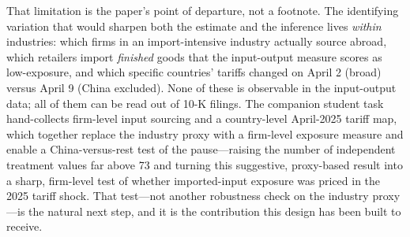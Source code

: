 \documentclass[12pt]{article}
\begin{document}
That limitation is the paper's point of departure, not a footnote. The identifying variation
that would sharpen both the estimate and the inference lives \emph{within} industries: which
firms in an import-intensive industry actually source abroad, which retailers import
\emph{finished} goods that the input-output measure scores as low-exposure, and which specific
countries' tariffs changed on April 2 (broad) versus April 9 (China excluded). None of these
is observable in the input-output data; all of them can be read out of 10-K filings. The
companion student task hand-collects firm-level input sourcing and a country-level April-2025
tariff map, which together replace the industry proxy with a firm-level exposure measure and
enable a China-versus-rest test of the pause---raising the number of independent treatment
values far above 73 and turning this suggestive, proxy-based result into a sharp,
firm-level test of whether imported-input exposure was priced in the 2025 tariff shock. That
test---not another robustness check on the industry proxy---is the natural next step, and it is
the contribution this design has been built to receive.
\end{document}
